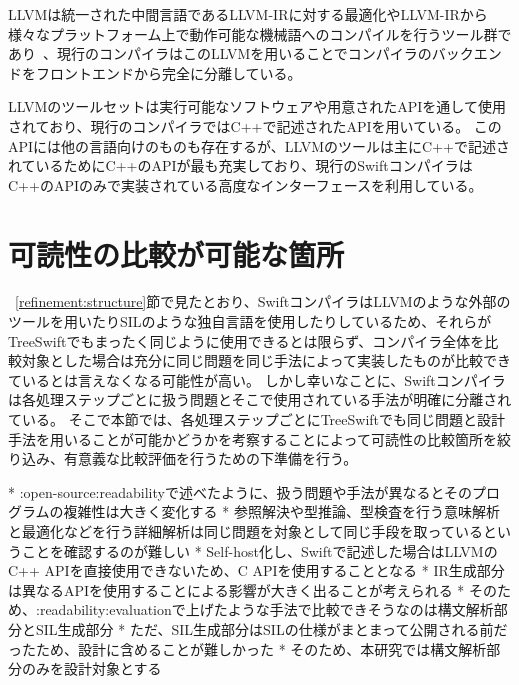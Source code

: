 LLVMは統一された中間言語であるLLVM-IRに対する最適化やLLVM-IRから様々なプラットフォーム上で動作可能な機械語へのコンパイルを行うツール群であり~\cite{llvm}、現行のコンパイラはこのLLVMを用いることでコンパイラのバックエンドをフロントエンドから完全に分離している。

LLVMのツールセットは実行可能なソフトウェアや用意されたAPIを通して使用されており、現行のコンパイラではC++で記述されたAPIを用いている。
このAPIには他の言語向けのものも存在するが、LLVMのツールは主にC++で記述されているためにC++のAPIが最も充実しており、現行のSwiftコンパイラはC++のAPIのみで実装されている高度なインターフェースを利用している。


\section{可読性の比較が可能な箇所}
\label{refinement:comperable}

~\ref{refinement:structure}節で見たとおり、SwiftコンパイラはLLVMのような外部のツールを用いたりSILのような独自言語を使用したりしているため、それらがTreeSwiftでもまったく同じように使用できるとは限らず、コンパイラ全体を比較対象とした場合は充分に同じ問題を同じ手法によって実装したものが比較できているとは言えなくなる可能性が高い。
しかし幸いなことに、Swiftコンパイラは各処理ステップごとに扱う問題とそこで使用されている手法が明確に分離されている。
そこで本節では、各処理ステップごとにTreeSwiftでも同じ問題と設計手法を用いることが可能かどうかを考察することによって可読性の比較箇所を絞り込み、有意義な比較評価を行うための下準備を行う。

* :open-source:readabilityで述べたように、扱う問題や手法が異なるとそのプログラムの複雑性は大きく変化する
* 参照解決や型推論、型検査を行う意味解析と最適化などを行う詳細解析は同じ問題を対象として同じ手段を取っているということを確認するのが難しい
* Self-host化し、Swiftで記述した場合はLLVMのC++ APIを直接使用できないため、C APIを使用することとなる
* IR生成部分は異なるAPIを使用することによる影響が大きく出ることが考えられる
* そのため、:readability:evaluationで上げたような手法で比較できそうなのは構文解析部分とSIL生成部分
* ただ、SIL生成部分はSILの仕様がまとまって公開される前だったため、設計に含めることが難しかった
* そのため、本研究では構文解析部分のみを設計対象とする

